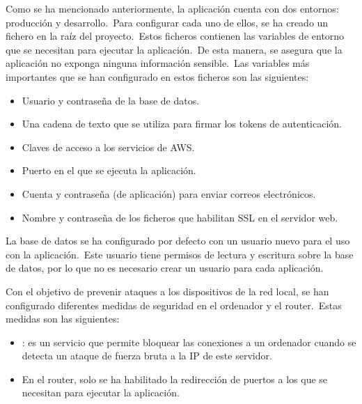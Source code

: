 Como se ha mencionado anteriormente, la aplicación cuenta con dos entornos: producción y desarrollo.\ Para configurar
cada uno de ellos, se ha creado un fichero  en la raíz del proyecto.\ Estos ficheros contienen las
variables de entorno que se necesitan para ejecutar la aplicación.\ De esta manera, se asegura que la aplicación
no exponga ninguna información sensible.\ Las variables más importantes
que se han configurado en estos ficheros son las siguientes:
\begin{itemize}
	\item Usuario y contraseña de la base de datos.
	\item Una cadena de texto que se utiliza para firmar los tokens de autenticación.
	\item Claves de acceso a los servicios de AWS\@.
	\item Puerto en el que se ejecuta la aplicación.
	\item Cuenta y contraseña (de aplicación) para enviar correos electrónicos.
	\item Nombre y contraseña de los ficheros que habilitan SSL en el servidor web.
\end{itemize}
\label{itm:env_variables}

La base de datos se ha configurado por defecto con un usuario nuevo para el uso con la aplicación.\ Este usuario tiene
permisos de lectura y escritura sobre la base de datos, por lo que no es necesario crear un usuario para cada
aplicación.

Con el objetivo de prevenir ataques a los dispositivos de la red local, se han configurado diferentes medidas de
seguridad en el
ordenador y el router.\ Estas medidas son las siguientes:
\begin{itemize}
	\item {}: es un servicio que permite bloquear las conexiones a un ordenador cuando se detecta un
	ataque de fuerza bruta a la IP de este servidor.
	\item En el router, solo se ha habilitado la redirección de puertos a los que se necesitan para ejecutar la
	aplicación.
\end{itemize}
